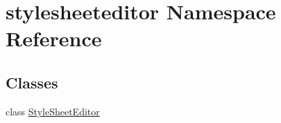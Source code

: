 \hypertarget{namespacestylesheeteditor}{}\section{stylesheeteditor Namespace Reference}
\label{namespacestylesheeteditor}
\subsection*{Classes}
\begin{DoxyCompactItemize}
\item 
class \hyperlink{classstylesheeteditor_1_1StyleSheetEditor}{Style\+Sheet\+Editor}
\end{DoxyCompactItemize}
